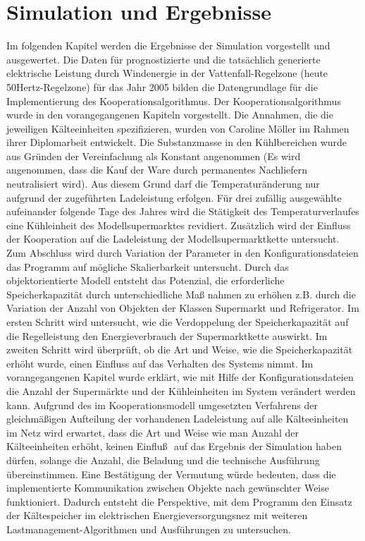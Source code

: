 \chapter{Simulation und Ergebnisse}
\minitoc
\label{chp:sue}
Im folgenden Kapitel werden die Ergebnisse der Simulation vorgestellt und
ausgewertet. Die Daten f\"ur prognostizierte und die tats\"achlich generierte
elektrische Leistung durch Windenergie in der Vattenfall-Regelzone (heute
50Hertz-Regelzone) f\"ur das Jahr 2005 bilden die Datengrundlage f\"ur die
Implementierung des Kooperationsalgorithmus. Der Kooperationsalgorithmus wurde
in den vorangegangenen Kapiteln vorgestellt. Die Annahmen, die die jeweiligen
K\"alteeinheiten spezifizieren, wurden von Caroline M\"oller im Rahmen ihrer
Diplomarbeit entwickelt\cite{caro}. Die Substanzmasse in den K\"uhlbereichen
wurde aus Gr\"unden der Vereinfachung als Konstant angenommen (Es wird
angenommen, dass die Kauf der Ware durch permanentes Nachliefern neutralisiert
wird). Aus diesem Grund darf die Temperatur\"anderung nur aufgrund der
zugef\"uhrten Ladeleistung erfolgen. F\"ur drei zuf\"allig ausgew\"ahlte
aufeinander folgende Tage des Jahres wird die St\"atigkeit des
Temperaturverlaufes eine K\"uhleinheit des Modellsupermarktes revidiert.
Zus\"atzlich wird der Einfluss der Kooperation auf die Ladeleistung der
Modellsupermarktkette untersucht. Zum Abschluss wird durch Variation der
Parameter in den Konfigurationsdateien das Programm auf m\"ogliche
Skalierbarkeit untersucht. Durch das objektorientierte Modell entsteht das
Potenzial, die erforderliche Speicherkapazit\"at durch unterschiedliche Ma\ss
nahmen zu erh\"ohen z.B. durch die Variation der Anzahl von Objekten der Klassen
Supermarkt und Refrigerator. Im ersten Schritt wird untersucht, wie die
Verdoppelung der Speicherkapazit\"at auf die Regelleistung den Energieverbrauch
der Supermarktkette auswirkt. Im zweiten Schritt wird \"uberpr\"uft, ob die Art
und Weise, wie die Speicherkapazit\"at erh\"oht wurde, einen Einfluss auf das
Verhalten des Systems nimmt. Im vorangegangenen Kapitel wurde erkl\"art, wie mit
Hilfe der Konfigurationsdateien die Anzahl der Superm\"arkte und der
K\"uhleinheiten im System ver\"andert werden kann. Aufgrund des im
Kooperationsmodell umgesetzten Verfahrens der gleichm\"a\ss igen Aufteilung der
vorhandenen Ladeleistung auf alle K\"alteeinheiten im Netz wird erwartet, dass
die Art und Weise wie man Anzahl der K\"alteeinheiten erh\"oht, keinen Einflu\ss
$ $ auf das Ergebnis der Simulation haben d\"urfen, solange die Anzahl, die
Beladung und die technische Ausf\"uhrung \"ubereinstimmen. Eine Best\"atigung
der Vermutung w\"urde bedeuten, dass die implementierte Kommunikation zwischen
Objekte nach gew\"unschter Weise funktioniert. Dadurch entsteht die Perspektive,
mit dem Programm den Einsatz der K\"altespeicher im elektrischen
Energieversorgungsnez mit weiteren Lastmanagement-Algorithmen und Ausf\"uhrungen
zu untersuchen.

